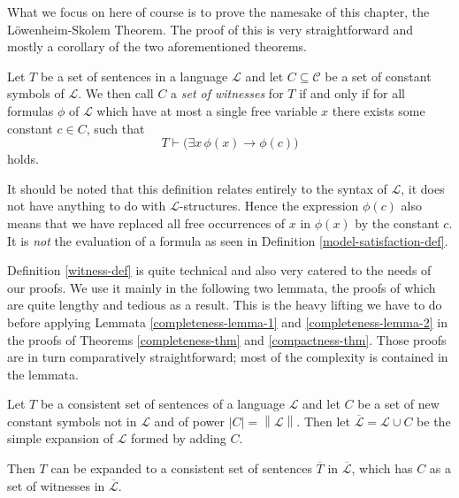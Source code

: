 \documentclass[../../main.tex]{subfiles}
\begin{document}
What we focus on here of course is to prove the namesake of this chapter, the Löwenheim-Skolem Theorem.
The proof of this is very straightforward and mostly a corollary of the two aforementioned theorems.

\begin{definition}\label{witness-def}\cite[p.61]{Cha90}
    Let $T$ be a set of sentences in a language $\mathcal{L}$ and let $C \subseteq \mathcal{C}$ be a set of constant symbols of $\mathcal{L}$.
    We then call $C$ a \emph{set of witnesses} for $T$ if and only if for all formulas $\phi$ of $\mathcal{L}$ which have at most a single free variable $x$ there exists some constant $c \in C$, 
    such that
    $$T \vdash \big(\exists x \, \phi(x) \rightarrow \phi(c)\big)$$
    holds.
\end{definition}

It should be noted that this definition relates entirely to the syntax of $\mathcal{L}$, it does not have anything to do with $\mathcal{L}$-structures.
Hence the expression $\phi(c)$ also means that we have replaced all free occurrences of $x$ in $\phi(x)$ by the constant $c$.
It is \emph{not} the evaluation of a formula as seen in Definition \ref{model-satisfaction-def}.

Definition \ref{witness-def} is quite technical and also very catered to the needs of our proofs.
We use it mainly in the following two lemmata, the proofs of which are quite lengthy and tedious as a result.
This is the heavy lifting we have to do before applying Lemmata \ref{completeness-lemma-1} and \ref{completeness-lemma-2} in the proofs of Theorems \ref{completeness-thm} and \ref{compactness-thm}.
Those proofs are in turn comparatively straightforward; most of the complexity is contained in the lemmata.

\begin{lemma}\label{completeness-lemma-1}\cite[Lemma 2.1.1]{Cha90}
    Let $T$ be a consistent set of sentences of a language $\mathcal{L}$ and   
    let $C$ be a set of new constant symbols not in $\mathcal{L}$ and of power $\left\lvert C \right\rvert = \left\lVert \mathcal{L} \right\rVert$.
    Then let $\overline{\mathcal{L}} = \mathcal{L} \cup C$ be the simple expansion of $\mathcal{L}$ formed by adding $C$.
    
    Then $T$ can be expanded to a consistent set of sentences $\overline{T}$ in $\overline{\mathcal{L}}$, which has $C$ as a set of witnesses in $\overline{\mathcal{L}}$.
\end{lemma}
\end{document}

